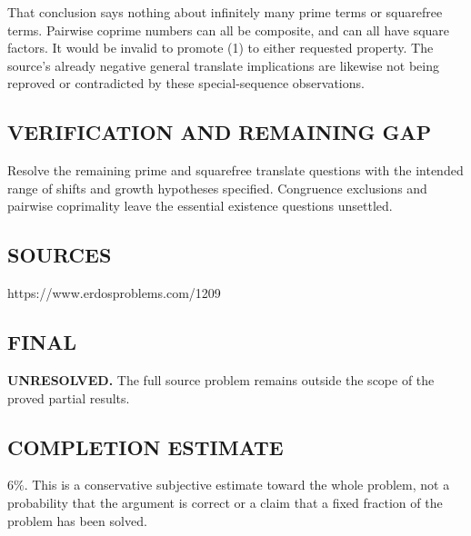 That conclusion says nothing about infinitely many prime terms or squarefree
terms. Pairwise coprime numbers can all be composite, and can all have square
factors. It would be invalid to promote (1) to either requested property.
The source's already negative general translate implications are likewise
not being reproved or contradicted by these special-sequence observations.

\subsection*{VERIFICATION AND REMAINING GAP}
Resolve the remaining prime and squarefree translate questions with the
intended range of shifts and growth hypotheses specified. Congruence exclusions
and pairwise coprimality leave the essential existence questions unsettled.

\subsection*{SOURCES}
https://www.erdosproblems.com/1209

\subsection*{FINAL}
\textbf{UNRESOLVED.} The full source problem remains outside the scope of the proved partial results.

\subsection*{COMPLETION ESTIMATE}
$6\%$. This is a conservative subjective estimate toward the whole problem, not a probability that the argument is correct or a claim that a fixed fraction of the problem has been solved.
